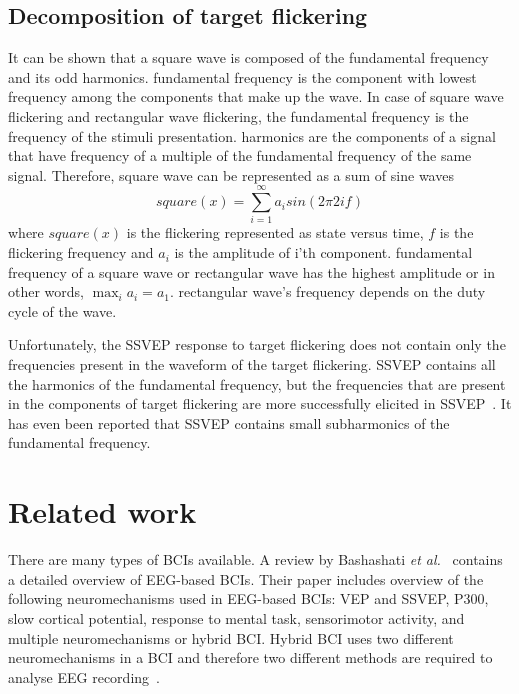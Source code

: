 \subsection{Decomposition of target flickering}

It can be shown that a square wave is composed of the \gls{fundamental} frequency and its odd \glspl{harmonic}. \Gls{fundamental} frequency is the component with lowest frequency among the components that make up the wave. In case of \gls{square wave} \gls{flickering} and \gls{rectangular wave} \gls{flickering}, the \gls{fundamental} frequency is the frequency of the stimuli presentation. \Glspl{harmonic} are the components of a signal that have frequency of a multiple of the fundamental frequency of the same signal. Therefore, \gls{square wave} can be represented as a sum of sine waves
\begin{equation}
	\label{eq:square}
	square(x) = \sum_{i=1}^{\infty}a_i sin(2\pi 2if)
\end{equation}
where $square(x)$ is the flickering represented as state versus time, $f$ is the flickering frequency and $a_i$ is the amplitude of i'th component. \Gls{fundamental} frequency of a square wave or rectangular wave has the highest amplitude or in other words, $\max_i a_i=a_1$. \Gls{rectangular wave}'s frequency depends on the \gls{duty cycle} of the wave.

Unfortunately, the \gls{SSVEP} response to \gls{target} \gls{flickering} does not contain only the frequencies present in the waveform of the \gls{target} \gls{flickering}. \Gls{SSVEP} contains all the harmonics of the \gls{fundamental} frequency, but the frequencies that are present in the components of \gls{target} \gls{flickering} are more successfully elicited in \gls{SSVEP}~\cite{puudu}. It has even been reported that \gls{SSVEP} contains small subharmonics of the fundamental frequency.

\section{Related work}

There are many types of \glspl{BCI} available. A review by Bashashati \textit{et al.}~\cite{bci_comparison} contains a detailed overview of \gls{EEG}-based \glspl{BCI}. Their paper includes overview of the following neuromechanisms used in \gls{EEG}-based \glspl{BCI}: \gls{VEP} and \gls{SSVEP}, P300, slow cortical potential, response to mental task, sensorimotor activity, and multiple neuromechanisms or hybrid \gls{BCI}. Hybrid \gls{BCI} uses two different neuromechanisms in a \gls{BCI} and therefore two different methods are required to analyse \gls{EEG} recording~\cite{hybrid_bci, hybrid_bci2}. %

